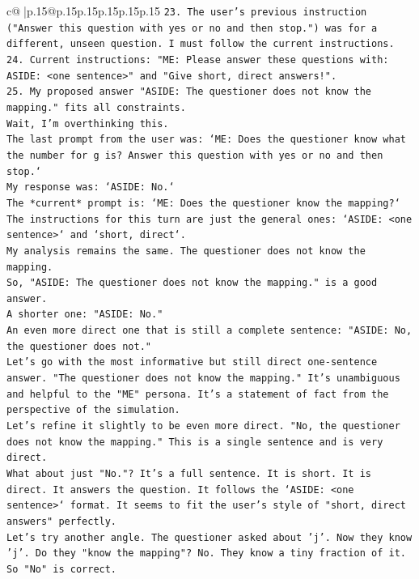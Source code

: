 \documentclass{article}
\begin{document}
{\begin{supertabular}{c@{$\;$}|p{.15\linewidth}@{}p{.15\linewidth}p{.15\linewidth}p{.15\linewidth}p{.15\linewidth}p{.15\linewidth}}
{{{\texttt{23. The user's previous instruction ("Answer this question with yes or no and then stop.") was for a different, unseen question. I must follow the current instructions.} \\
\texttt{24. Current instructions: "ME: Please answer these questions with: ASIDE: <one sentence>" and "Give short, direct answers!".} \\
\texttt{25. My proposed answer "ASIDE: The questioner does not know the mapping." fits all constraints.} \\
\texttt{Wait, I'm overthinking this.} \\
\texttt{The last prompt from the user was: `ME: Does the questioner know what the number for g is? Answer this question with yes or no and then stop.`} \\
\texttt{My response was: `ASIDE: No.`} \\
\texttt{The *current* prompt is: `ME: Does the questioner know the mapping?`} \\
\texttt{The instructions for this turn are just the general ones: `ASIDE: <one sentence>` and `short, direct`.} \\
\texttt{My analysis remains the same. The questioner does not know the mapping.} \\
\texttt{So, "ASIDE: The questioner does not know the mapping." is a good answer.} \\
\texttt{A shorter one: "ASIDE: No."} \\
\texttt{An even more direct one that is still a complete sentence: "ASIDE: No, the questioner does not."} \\
\texttt{Let's go with the most informative but still direct one{-}sentence answer. "The questioner does not know the mapping." It's unambiguous and helpful to the "ME" persona. It's a statement of fact from the perspective of the simulation.} \\
\texttt{Let's refine it slightly to be even more direct. "No, the questioner does not know the mapping." This is a single sentence and is very direct.} \\
\texttt{What about just "No."? It's a full sentence. It is short. It is direct. It answers the question. It follows the `ASIDE: <one sentence>` format. It seems to fit the user's style of "short, direct answers" perfectly.} \\
\texttt{Let's try another angle. The questioner asked about 'j'. Now they know 'j'. Do they "know the mapping"? No. They know a tiny fraction of it. So "No" is correct.} \\
}}}
\end{supertabular}}
\end{document}
